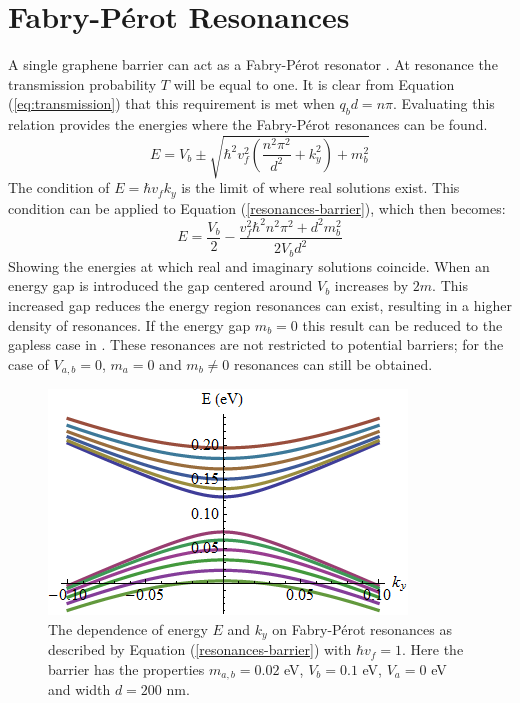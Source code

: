 			\section{Fabry-P\'{e}rot Resonances}
			\label{Rectangular Barrier - Fabry-Perot Resonances}
				A single graphene barrier can act as a Fabry-P\'{e}rot resonator \cite{b38}. At resonance the transmission probability $T$ will be equal to one. It is clear from Equation (\ref{eq:transmission}) that this requirement is met when $q_{b}d=n\pi$. Evaluating this relation provides the energies where the Fabry-P\'{e}rot resonances can be found.
				\begin{equation}
					E=V_{b}\pm\sqrt{\hbar^{2}v_{f}^{2}\left(\frac{n^{2}\pi^{2}}{d^{2}}+k_{y}^{2}\right)+m_{b}^{2}}
					\label{resonances-barrier}
				\end{equation}
				The condition of $E=\hbar v_{f}k_{y}$ is the limit of where real solutions exist. This condition can be applied to Equation (\ref{resonances-barrier}), which then becomes:
				\begin{equation}
					E=\frac{V_{b}}{2}-\frac{v_{f}^{2}\hbar^{2}n^{2}\pi^{2}+d^{2}m_{b}^{2}}{2V_{b}d^{2}}
				\end{equation}
	Showing the energies at which real and imaginary solutions coincide. When an energy gap is introduced the gap centered around $V_{b}$ increases by $2m$. This increased gap reduces the energy region resonances can exist, resulting in a higher density of resonances. If the energy gap $m_{b}=0$ this result can be reduced to the gapless case in \cite{b14}. These resonances are not restricted to potential barriers; for the case of $V_{a,b}=0$, $m_{a}=0$ and $m_{b} \neq 0$ resonances can still be obtained.
\begin{figure}
	\centerline{\includegraphics[scale=0.5]{images/mass-potential-energy-levels}}
	\label{}
	\caption{The dependence of energy $E$ and $k_{y}$ on Fabry-P\'{e}rot resonances as described by Equation (\ref{resonances-barrier}) with $\hbar v_{f}=1$. Here the barrier has the properties $m_{a,b}=0.02$ eV, $V_{b}=0.1$ eV, $V_{a}=0$ eV and width $d=200$ nm.}
\end{figure}
